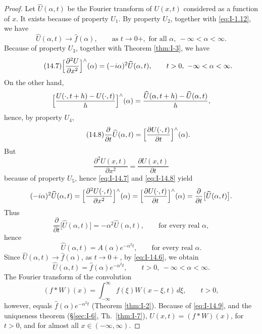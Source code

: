 \begin{proof}
Let $\widehat U(\alpha,t)$ be the Fourier transform of $U(x,t)$ considered as a function of $x$. It exists because of property $U_1$. By property $U_2$, together with \eqref{eq:I-1.12}, we have
\begin{equation}\label{eq:I-14.6}\tag{14.6}
\widehat U(\alpha,t)\to\widehat f(\alpha),\qquad\text{as }t\to 0+,\text{ for all }\alpha,\ -\infty<\alpha<\infty.
\end{equation}
Because of property $U_3$, together with Theorem \ref{thm:I-3}, we have
\begin{equation}\label{eq:I-14.7}\tag{14.7}
\Bigl[\frac{\partial^{2}U}{\partial x^{2}}\Bigr]^{\wedge}(\alpha)=(-i\alpha)^{2}\widehat U(\alpha,t),\qquad t>0,\ -\infty<\alpha<\infty.
\end{equation}
On the other hand,
\begin{equation*}
\Bigl[\frac{U(\cdot,t+h)-U(\cdot,t)}{h}\Bigr]^{\wedge}(\alpha)
=\frac{\widehat U(\alpha,t+h)-\widehat U(\alpha,t)}{h},
\end{equation*}
hence, by property $U_4$,
\begin{equation}\label{eq:I-14.8}\tag{14.8}
\frac{\partial}{\partial t}\widehat U(\alpha,t)
=\Bigl[\frac{\partial U(\cdot,t)}{\partial t}\Bigr]^{\wedge}(\alpha).
\end{equation}
But
\begin{equation*}
\frac{\partial^{2}U(x,t)}{\partial x^{2}}=\frac{\partial U(x,t)}{\partial t}
\end{equation*}
because of property $U_5$, hence \eqref{eq:I-14.7} and \eqref{eq:I-14.8} yield
\begin{equation*}
(-i\alpha)^{2}\widehat U(\alpha,t)
=\Bigl[\frac{\partial^{2}U(\cdot,t)}{\partial x^{2}}\Bigr]^{\wedge}(\alpha)
=\Bigl[\frac{\partial U(\cdot,t)}{\partial t}\Bigr]^{\wedge}(\alpha)
=\frac{\partial}{\partial t}\bigl[\widehat U(\alpha,t)\bigr].
\end{equation*}
Thus
\begin{equation*}
\frac{\partial}{\partial t}\bigl[\widehat U(\alpha,t)\bigr]=-\alpha^{2}\widehat U(\alpha,t),\qquad\text{for every real }\alpha,
\end{equation*}
hence
\begin{equation*}
\widehat U(\alpha,t)=A(\alpha)e^{-\alpha^{2}t},\qquad\text{for every real }\alpha.
\end{equation*}
Since $\widehat U(\alpha,t)\to\widehat f(\alpha)$, as $t\to 0+$, by \eqref{eq:I-14.6}, we obtain
\begin{equation}\label{eq:I-14.9}\tag{14.9}
\widehat U(\alpha,t)=\widehat f(\alpha)e^{-\alpha^{2}t},\qquad t>0,\ -\infty<\alpha<\infty.
\end{equation}
The Fourier transform of the convolution
\begin{equation*}
(f*W)(x)=\int_{-\infty}^{\infty}f(\xi)W(x-\xi,t)\,d\xi,\qquad t>0,
\end{equation*}
however, equals $\widehat f(\alpha)e^{-\alpha^{2}t}$ (Theorem \ref{thm:I-2}). Because of \eqref{eq:I-14.9}, and the uniqueness theorem (\S\ref{sec:I-6}, Th.~\ref{thm:I-7}), $U(x,t)=(f*W)(x)$, for $t>0$, and for almost all $x\in(-\infty,\infty)$.
\end{proof}

